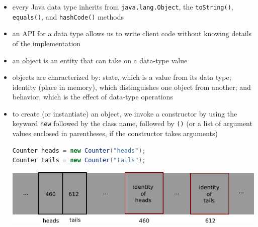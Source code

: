 \documentclass[8pt,a4paper,compress]{beamer}
\begin{document}
\begin{frame}[fragile]
\begin{itemize}
\item every Java data type inherits from \lstinline{java.lang.Object}, the \lstinline{toString()}, \lstinline{equals()}, and \lstinline{hashCode()} methods

\item an API for a data type allows us to write client code without knowing details of the implementation

\item an object is an entity that can take on a data-type value

\item objects are characterized by: state, which is a value from its data type; identity (place in memory), which distinguishes one object from another; and behavior, which is the effect of data-type operations

\item to create (or instantiate) an object, we invoke a constructor by using the keyword \lstinline{new} followed by the class name, followed by \lstinline{()} (or a list of argument values enclosed in parentheses, if the constructor takes arguments)

\begin{lstlisting}[language=Java]
Counter heads = new Counter("heads");
Counter tails = new Counter("tails");
\end{lstlisting}

\begin{center}
\includegraphics[scale=0.8]{./figures/obj_rep.pdf}
\end{center}
\end{itemize}
\end{frame}
\end{document}
